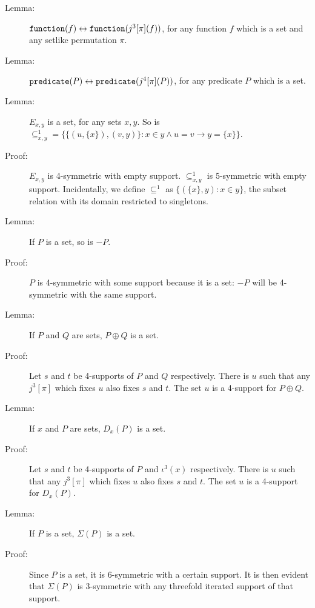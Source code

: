 \documentclass[12pt]{article}
\begin{document}
\begin{description}


\item[Lemma:] ${\tt function}(f) \leftrightarrow {\tt function}(j^3[\pi](f))$, for any function $f$ which is a set and any setlike permutation $\pi$.

\item[Lemma:] ${\tt predicate}(P) \leftrightarrow {\tt predicate}(j^4[\pi](P))$, for any predicate $P$ which is a set.

\item[Lemma:]  $E_{x,y}$ is a set, for any sets $x,y$.  So is $\subseteq^1_{x,y} = \{\{(u,\{x\}),(v,y)\}:x \in y \wedge u=v \rightarrow y = \{x\}\}$.

\item[Proof:]  $E_{x,y}$ is 4-symmetric with empty support.  $\subseteq^1_{x,y}$ is 5-symmetric with empty support.
Incidentally, we define $\subseteq^1$ as $\{(\{x\},y):x \in y\}$, the subset relation with its domain restricted to singletons.

\item[Lemma:]  If $P$ is a set, so is $-P$.

\item[Proof:]  $P$ is 4-symmetric with some support because it is a set:  $-P$ will be 4-symmetric with the same support.

\item[Lemma:]  If $P$ and $Q$ are sets, $P \oplus Q$ is a set.

\item[Proof:]  Let $s$ and $t$ be 4-supports of $P$ and $Q$ respectively.  There is $u$ such that any $j^3[\pi]$ which fixes $u$ also fixes $s$ and $t$.  The set $u$ is a 4-support for $P \oplus Q$.

\item[Lemma:]  If $x$ and $P$ are sets, $D_x(P)$ is a set.

\item[Proof:]  Let $s$ and $t$ be 4-supports of $P$ and $\iota^3(x)$ respectively.  There is $u$ such that any $j^3[\pi]$ which fixes $u$ also fixes $s$ and $t$. The set $u$ is a 4-support for $D_x(P)$.

\item[Lemma:]  If $P$ is a set, $\Sigma(P)$ is a set.

\item[Proof:]  Since $P$ is a set, it is 6-symmetric with a certain support.  It is then evident that $\Sigma(P)$ is 3-symmetric with any threefold iterated support of that support.

\end{description}
\end{document}
